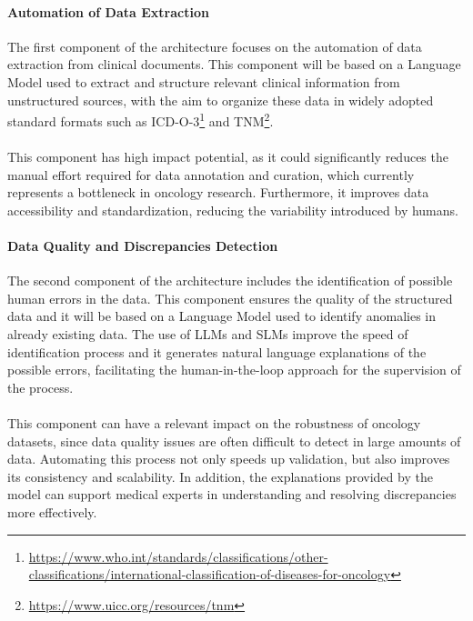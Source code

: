 \documentclass{scrartcl}
\begin{document}
\paragraph{Automation of Data Extraction}{The first component of the architecture focuses on the automation of data extraction from clinical documents. This component will be based on a Language Model used to extract and structure relevant clinical information from unstructured sources, with the aim to organize these data in widely adopted standard formats such as ICD-O-3\footnote{\url{https://www.who.int/standards/classifications/other-classifications/international-classification-of-diseases-for-oncology}} and TNM\footnote{\url{https://www.uicc.org/resources/tnm}}.
\\\\
This component has high impact potential, as it could significantly reduces the manual effort required for data annotation and curation, which currently represents a bottleneck in oncology research. Furthermore, it improves data accessibility and standardization, reducing the variability introduced by humans.
}
\paragraph{Data Quality and Discrepancies Detection}{The second component of the architecture includes the identification of possible human errors in the data. This component ensures the quality of the structured data and it will be based on a Language Model used to identify anomalies in already existing data. The use of LLMs and SLMs improve the speed of identification process and it generates natural language explanations of the possible errors, facilitating the human-in-the-loop approach for the supervision of the process.
\\\\
This component can have a relevant impact on the robustness of oncology datasets, since data quality issues are often difficult to detect in large amounts of data. Automating this process not only speeds up validation, but also improves its consistency and scalability. In addition, the explanations provided by the model can support medical experts in understanding and resolving discrepancies more effectively.}
\end{document}
